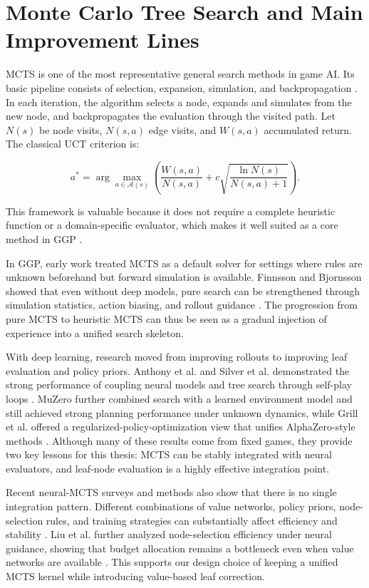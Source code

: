 \section{Monte Carlo Tree Search and Main Improvement Lines}

MCTS is one of the most representative general search methods in game AI. Its basic pipeline consists of selection, expansion, simulation, and backpropagation \cite{browne2012survey}. In each iteration, the algorithm selects a node, expands and simulates from the new node, and backpropagates the evaluation through the visited path. Let $N(s)$ be node visits, $N(s,a)$ edge visits, and $W(s,a)$ accumulated return. The classical UCT criterion is:

\begin{equation}
a^\ast=\arg\max_{a\in\mathcal{A}(s)}
\left(
\frac{W(s,a)}{N(s,a)}
+
c\sqrt{\frac{\ln N(s)}{N(s,a)+1}}
\right).
\end{equation}

This framework is valuable because it does not require a complete heuristic function or a domain-specific evaluator, which makes it well suited as a core method in GGP \cite{browne2012survey}.

In GGP, early work treated MCTS as a default solver for settings where rules are unknown beforehand but forward simulation is available. Finnsson and Bjornsson showed that even without deep models, pure search can be strengthened through simulation statistics, action biasing, and rollout guidance \cite{finnsson2008simulation}. The progression from pure MCTS to heuristic MCTS can thus be seen as a gradual injection of experience into a unified search skeleton.

With deep learning, research moved from improving rollouts to improving leaf evaluation and policy priors. Anthony et al. and Silver et al. demonstrated the strong performance of coupling neural models and tree search through self-play loops \cite{anthony2017thinking,silver2018general}. MuZero further combined search with a learned environment model and still achieved strong planning performance under unknown dynamics, while Grill et al. offered a regularized-policy-optimization view that unifies AlphaZero-style methods \cite{schrittwieser2020muzero,grill2020regularized}. Although many of these results come from fixed games, they provide two key lessons for this thesis: MCTS can be stably integrated with neural evaluators, and leaf-node evaluation is a highly effective integration point.

Recent neural-MCTS surveys and methods also show that there is no single integration pattern. Different combinations of value networks, policy priors, node-selection rules, and training strategies can substantially affect efficiency and stability \cite{kemmerling2023neural}. Liu et al. further analyzed node-selection efficiency under neural guidance, showing that budget allocation remains a bottleneck even when value networks are available \cite{liu2024efficient}. This supports our design choice of keeping a unified MCTS kernel while introducing value-based leaf correction.

